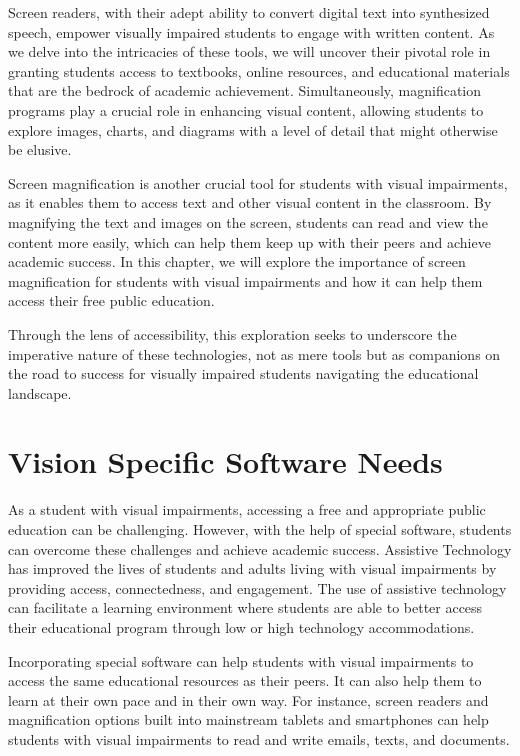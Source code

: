 \documentclass[14pt,letterpaper,twoside]{extreport}
\begin{document}
Screen readers, with their adept ability to convert digital text into synthesized speech, empower visually impaired students to engage with written content. As we delve into the intricacies of these tools, we will uncover their pivotal role in granting students access to textbooks, online resources, and educational materials that are the bedrock of academic achievement. Simultaneously, magnification programs play a crucial role in enhancing visual content, allowing students to explore images, charts, and diagrams with a level of detail that might otherwise be elusive.

Screen magnification is another crucial tool for students with visual impairments, as it enables them to access text and other visual content in the classroom.  By magnifying the text and images on the screen, students can read and view the content more easily, which can help them keep up with their peers and achieve academic success. In this chapter, we will explore the importance of screen magnification for students with visual impairments and how it can help them access their free public education.

Through the lens of accessibility, this exploration seeks to underscore the imperative nature of these technologies, not as mere tools but as companions on the road to success for visually impaired students navigating the educational landscape.

\pagebreak \hypertarget{software-needs}{}\section{Vision Specific Software Needs}\label{software-needs}
As a student with visual impairments, accessing a free and appropriate public education can be challenging. However, with the help of special software, students can overcome these challenges and achieve academic success. Assistive Technology has improved the lives of students and adults living with visual impairments by providing access, connectedness, and engagement. The use of assistive technology can facilitate a learning environment where students are able to better access their educational program through low or high technology accommodations.

Incorporating special software can help students with visual impairments to access the same educational resources as their peers. It can also help them to learn at their own pace and in their own way. For instance, screen readers and magnification options built into mainstream tablets and smartphones can help students with visual impairments to read and write emails, texts, and documents.
\end{document}
